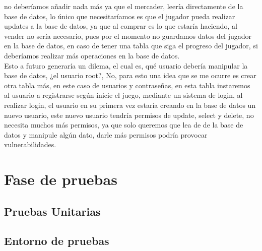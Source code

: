\documentclass[a4paper]{article}
\begin{document}
no deberíamos añadir nada más ya que el mercader, leería directamente de la base de datos, lo único que necesitaríamos es que el jugador pueda realizar updates a la base de datos, ya que al comprar es lo que estaría haciendo, al vender no sería necesario, pues
por el momento no guardamos datos del jugador en la base de datos, en caso de tener una tabla que siga el progreso del jugador, si deberíamos realizar más operaciones en la base de datos.\\
Esto a futuro generaría un dilema, el cual es, qué usuario debería manipular la base de datos, ¿el usuario root?, No, para esto una idea que se me ocurre es crear otra tabla más, en este caso de usuarios y contraseñas, en esta tabla instaremos al usuario a registrarse según inicie el juego, mediante un sistema de login,
al realizar login, el usuario en su primera vez estaría creando en la base de datos un nuevo usuario, este nuevo usuario tendría permisos de update, select y delete, no necesita muchos más permisos, ya que solo queremos que lea de de la base de datos y manipule algún dato, darle más permisos podría provocar vulnerabilidades.
\clearpage
\section{Fase de pruebas}
\subsection{Pruebas Unitarias}
\subsection{Entorno de pruebas}
\end{document}

